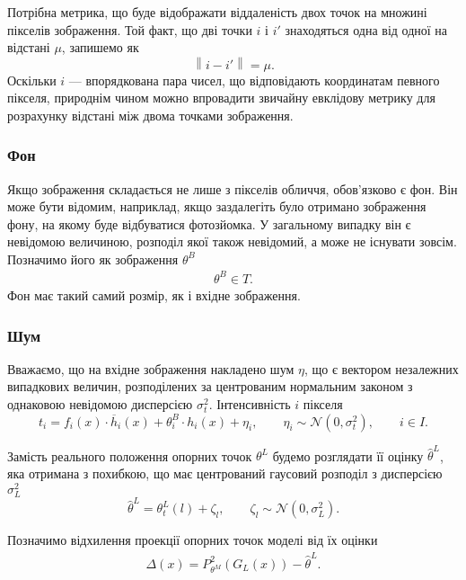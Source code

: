 Потрібна метрика,
що буде відображати віддаленість двох точок на множині пікселів зображення.
Той факт,
що дві точки $i$ і $i'$ знаходяться одна від одної на відстані $\mu$,
запишемо як
\begin{equation*}
  \left\| i - i' \right\| = \mu.
\end{equation*}
Оскільки $i$ --- впорядкована пара чисел,
що відповідають координатам певного пікселя,
природнім чином можно впровадити звичайну евклідову метрику
для розрахунку відстані між двома точками зображення.

\subsubsection{Фон}
Якщо зображення складається не лише з пікселів обличчя,
обов'язково є фон.
Він може бути відомим, наприклад,
якщо заздалегіть було отримано зображення фону,
на якому буде відбуватися фотозйомка.
У загальному випадку він є невідомою величиною,
розподіл якої також невідомий,
а може не існувати зовсім.
Позначимо його як зображення $\theta^B$
\begin{align*}
  \theta^B \in T.
\end{align*}
Фон має такий самий розмір, як і вхідне зображення.

\subsubsection{Шум}

Вважаємо,
що на вхідне зображення накладено шум $\eta$,
що є вектором незалежних випадкових величин,
розподілених за центрованим нормальним законом
з однаковою невідомою дисперсією $\sigma_t^2$.
Інтенсивність $i$ пікселя
\begin{equation*}
  t_i = f_i\left( x \right) \cdot \overline{h}_i\left( x \right)
    + \theta_i^B \cdot h_i\left( x \right) + \eta_i,\qquad
  \eta_i \sim \mathcal{N}\left( 0, \sigma^2_t\right), \qquad
  i \in I.
\end{equation*}

Замість реального положення опорних точок $\theta^L$
будемо розглядати її оцінку $\hat{\theta}^L$,
яка отримана з похибкою,
що має центрований гаусовий розподіл
з дисперсією $\sigma^2_L$
\begin{equation*}
  \hat{\theta}^L = \theta_t^L\left( l \right) + \zeta_l,
  \qquad \zeta_l \sim \mathcal{N}\left( 0, \sigma_L^2 \right).
\end{equation*}

Позначимо відхилення проекції опорних точок моделі
від їх оцінки
\begin{align*}
  \Delta\left( x \right)
  = P^2_{\theta^M}\left( G_L\left( x \right) \right) - \hat{\theta}^L.
\end{align*}

